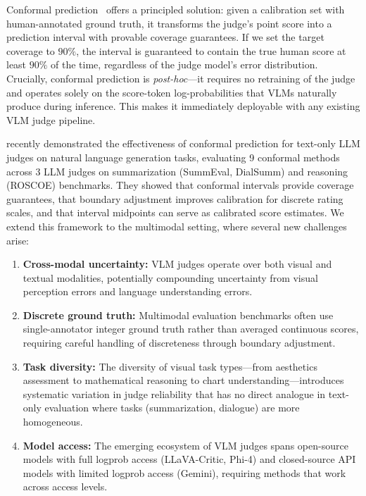 \documentclass{article}
\begin{document}
Conformal prediction~\citep{vovk2005algorithmic} offers a principled solution: given a calibration set with human-annotated ground truth, it transforms the judge's point score into a prediction interval with provable coverage guarantees. If we set the target coverage to $90\%$, the interval is guaranteed to contain the true human score at least $90\%$ of the time, regardless of the judge model's error distribution. Crucially, conformal prediction is \emph{post-hoc}---it requires no retraining of the judge and operates solely on the score-token log-probabilities that VLMs naturally produce during inference. This makes it immediately deployable with any existing VLM judge pipeline.

\citet{sheng2025analyzing} recently demonstrated the effectiveness of conformal prediction for text-only LLM judges on natural language generation tasks, evaluating 9 conformal methods across 3 LLM judges on summarization (SummEval, DialSumm) and reasoning (ROSCOE) benchmarks. They showed that conformal intervals provide coverage guarantees, that boundary adjustment improves calibration for discrete rating scales, and that interval midpoints can serve as calibrated score estimates. We extend this framework to the multimodal setting, where several new challenges arise:

\begin{enumerate}[leftmargin=*,itemsep=2pt,topsep=2pt]
\item \textbf{Cross-modal uncertainty:} VLM judges operate over both visual and textual modalities, potentially compounding uncertainty from visual perception errors and language understanding errors.
\item \textbf{Discrete ground truth:} Multimodal evaluation benchmarks often use single-annotator integer ground truth rather than averaged continuous scores, requiring careful handling of discreteness through boundary adjustment.
\item \textbf{Task diversity:} The diversity of visual task types---from aesthetics assessment to mathematical reasoning to chart understanding---introduces systematic variation in judge reliability that has no direct analogue in text-only evaluation where tasks (summarization, dialogue) are more homogeneous.
\item \textbf{Model access:} The emerging ecosystem of VLM judges spans open-source models with full logprob access (LLaVA-Critic, Phi-4) and closed-source API models with limited logprob access (Gemini), requiring methods that work across access levels.
\end{enumerate}
\end{document}
